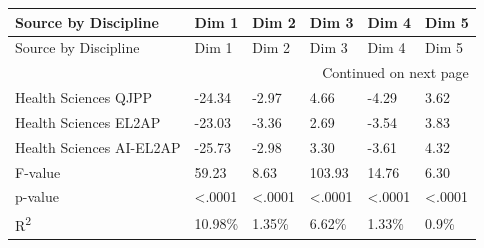 \begin{longtable}[c]{p{5.5cm}p{1.25cm}p{1.25cm}p{1.25cm}p{1.25cm}p{1.25cm}}
\toprule
Source by Discipline & Dim 1 & Dim 2 & Dim 3 & Dim 4 & Dim 5 \\
\midrule
\endfirsthead
\toprule
Source by Discipline & Dim 1 & Dim 2 & Dim 3 & Dim 4 & Dim 5 \\
\midrule
\endhead
\midrule
\multicolumn{6}{r}{Continued on next page} \\
\midrule
\endfoot
\bottomrule
\endlastfoot
Health Sciences QJPP & -24.34 & -2.97 & 4.66 & -4.29 & 3.62 \\
Health Sciences EL2AP & -23.03 & -3.36 & 2.69 & -3.54 & 3.83 \\
Health Sciences AI-EL2AP & -25.73 & -2.98 & 3.30 & -3.61 & 4.32 \\
\hline
F-value & 59.23 & 8.63 & 103.93 & 14.76 & 6.30 \\
p-value & <.0001 & <.0001 & <.0001 & <.0001 & <.0001 \\
R\textsuperscript{2} & 10.98\% & 1.35\% & 6.62\% & 1.33\% & 0.9\% \\
\end{longtable}
